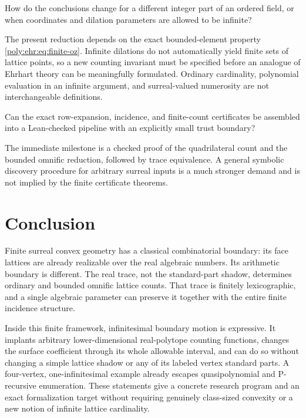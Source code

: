 \documentclass[11pt,a4paper]{article}
\numberwithin{equation}{section}
\theoremstyle{plain}
\begin{document}
\begin{question}
How do the conclusions change for a different integer part of an ordered
field, or when coordinates and dilation parameters are allowed to be
infinite?
\end{question}
The present reduction depends on the exact bounded-element property
\eqref{poly:ehr:eq:finite-oz}. Infinite dilations do not automatically yield finite
sets of lattice points, so a new counting invariant must be specified
before an analogue of Ehrhart theory can be meaningfully formulated.
Ordinary cardinality, polynomial evaluation in an infinite argument, and
surreal-valued numerosity are not interchangeable definitions.

\begin{question}
Can the exact row-expansion, incidence, and finite-count certificates be
assembled into a Lean-checked pipeline with an explicitly small trust
boundary?
\end{question}
The immediate milestone is a checked proof of the quadrilateral count
and the bounded omnific reduction, followed by trace equivalence. A general
symbolic discovery procedure for arbitrary surreal inputs is a much
stronger demand and is not implied by the finite certificate theorems.

\section{Conclusion}

Finite surreal convex geometry has a classical combinatorial boundary:
its face lattices are already realizable over the real algebraic numbers.
Its arithmetic boundary is different. The real trace, not the standard-part
shadow, determines ordinary and bounded omnific lattice counts. That trace
is finitely lexicographic, and a single algebraic parameter can preserve
it together with the entire finite incidence structure.

Inside this finite framework, infinitesimal boundary motion is expressive.
It implants arbitrary lower-dimensional real-polytope counting functions,
changes the surface coefficient through its whole allowable interval, and
can do so without changing a simple lattice shadow or any of its labeled
vertex standard parts. A four-vertex, one-infinitesimal example already
escapes quasipolynomial and P-recursive enumeration. These statements give
a concrete research program and an exact formalization target without
requiring genuinely class-sized convexity or a new notion of infinite
lattice cardinality.
\end{document}
